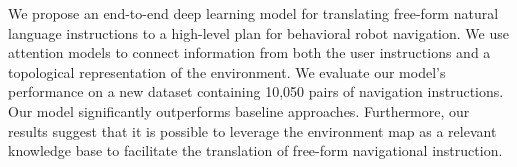 We propose an end-to-end deep learning model for translating free-form natural language instructions to a high-level plan for behavioral robot navigation. We use attention models to connect information from both the user instructions and a topological representation of the environment. We evaluate our model's performance on a new dataset containing 10,050 pairs of navigation instructions. Our model significantly outperforms baseline approaches. Furthermore, our results suggest that it is possible to leverage the environment map as a relevant knowledge base to facilitate the translation of free-form navigational instruction.
